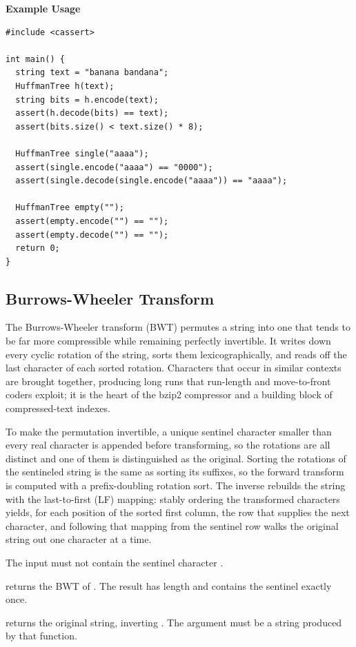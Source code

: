 \textbf{Example Usage}\par
\begin{lstlisting}[style=cpp]
#include <cassert>

int main() {
  string text = "banana bandana";
  HuffmanTree h(text);
  string bits = h.encode(text);
  assert(h.decode(bits) == text);
  assert(bits.size() < text.size() * 8);

  HuffmanTree single("aaaa");
  assert(single.encode("aaaa") == "0000");
  assert(single.decode(single.encode("aaaa")) == "aaaa");

  HuffmanTree empty("");
  assert(empty.encode("") == "");
  assert(empty.decode("") == "");
  return 0;
}
\end{lstlisting}
\subsection{Burrows-Wheeler Transform}
\label{sec:3.8.5}
The Burrows-Wheeler transform (BWT) permutes a string into one that tends to be far more compressible while remaining perfectly invertible. It writes down every cyclic rotation of the string, sorts them lexicographically, and reads off the last character of each sorted rotation. Characters that occur in similar contexts are brought together, producing long runs that run-length and move-to-front coders exploit; it is the heart of the bzip2 compressor and a building block of compressed-text indexes.

To make the permutation invertible, a unique sentinel character smaller than every real character is appended before transforming, so the rotations are all distinct and one of them is distinguished as the original. Sorting the rotations of the sentineled string is the same as sorting its suffixes, so the forward transform is computed with a prefix-doubling rotation sort. The inverse rebuilds the string with the last-to-first (LF) mapping: stably ordering the transformed characters yields, for each position of the sorted first column, the row that supplies the next character, and following that mapping from the sentinel row walks the original string out one character at a time.

The input must not contain the sentinel character \inlinecode{\textquotesingle{}\textbackslash{}0\textquotesingle{}}.

\begin{compactitem}
  \item {} returns the BWT of . The result has length  and contains the sentinel \inlinecode{\textquotesingle{}\textbackslash{}0\textquotesingle{}} exactly once.
  \item {} returns the original string, inverting . The argument must be a string produced by that function.
\end{compactitem}

